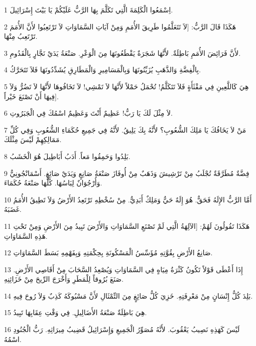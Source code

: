 \par 1 اِسْمَعُوا الْكَلِمَةَ الَّتِي تَكَلَّمَ بِهَا الرَّبُّ عَلَيْكُمْ يَا بَيْتَ إِسْرَائِيلَ.
\par 2 هَكَذَا قَالَ الرَّبُّ: [لاَ تَتَعَلَّمُوا طَرِيقَ الأُمَمِ وَمِنْ آيَاتِ السَّمَاوَاتِ لاَ تَرْتَعِبُوا لأَنَّ الأُمَمَ تَرْتَعِبُ مِنْهَا.
\par 3 لأَنَّ فَرَائِضَ الأُمَمِ بَاطِلَةٌ. لأَنَّهَا شَجَرَةٌ يَقْطَعُونَهَا مِنَ الْوَعْرِ. صَنْعَةُ يَدَيْ نَجَّارٍ بِالْقَدُومِ.
\par 4 بِالْفِضَّةِ وَالذَّهَبِ يُزَيِّنُونَهَا وَبِالْمَسَامِيرِ وَالْمَطَارِقِ يُشَدِّدُونَهَا فَلاَ تَتَحَرَّكُ.
\par 5 هِيَ كَاللَّعِينِ فِي مَقْثَأَةٍ فَلاَ تَتَكَلَّمُ! تُحْمَلُ حَمْلاً لأَنَّهَا لاَ تَمْشِي! لاَ تَخَافُوهَا لأَنَّهَا لاَ تَضُرُّ وَلاَ فِيهَا أَنْ تَصْنَعَ خَيْراً].
\par 6 لاَ مِثْلَ لَكَ يَا رَبُّ! عَظِيمٌ أَنْتَ وَعَظِيمٌ اسْمُكَ فِي الْجَبَرُوتِ.
\par 7 مَنْ لاَ يَخَافُكَ يَا مَلِكَ الشُّعُوبِ؟ لأَنَّهُ بِكَ يَلِيقُ. لأَنَّهُ فِي جَمِيعِ حُكَمَاءِ الشُّعُوبِ وَفِي كُلِّ مَمَالِكِهِمْ لَيْسَ مِثْلَكَ.
\par 8 بَلِدُوا وَحَمِقُوا مَعاً. أَدَبُ أَبَاطِيلَ هُوَ الْخَشَبُ.
\par 9 فِضَّةٌ مُطَرَّقَةٌ تُجْلَبُ مِنْ تَرْشِيشَ وَذَهَبٌ مِنْ أُوفَازَ صَنْعَةُ صَانِعٍ وَيَدَيْ صَائِغٍ. أَسْمَانْجُونِيٌّ وَأُرْجُوَانٌ لِبَاسُهَا. كُلُّهَا صَنْعَةُ حُكَمَاءَ.
\par 10 أَمَّا الرَّبُّ الإِلَهُ فَحَقٌّ. هُوَ إِلَهٌ حَيٌّ وَمَلِكٌ أَبَدِيٌّ. مِنْ سُخْطِهِ تَرْتَعِدُ الأَرْضُ وَلاَ تَطِيقُ الأُمَمُ غَضَبَهُ.
\par 11 هَكَذَا تَقُولُونَ لَهُمْ: [الآلِهَةُ الَّتِي لَمْ تَصْنَعِ السَّمَاوَاتِ وَالأَرْضَ تَبِيدُ مِنَ الأَرْضِ وَمِنْ تَحْتِ هَذِهِ السَّمَاوَاتِ.
\par 12 صَانِعُ الأَرْضِ بِقُوَّتِهِ مُؤَسِّسُ الْمَسْكُونَةِ بِحِكْمَتِهِ وَبِفَهْمِهِ بَسَطَ السَّمَاوَاتِ.
\par 13 إِذَا أَعْطَى قَوْلاً تَكُونُ كَثْرَةُ مِيَاهٍ فِي السَّمَاوَاتِ وَيُصْعِدُ السَّحَابَ مِنْ أَقَاصِي الأَرْضِ. صَنَعَ بُرُوقاً لِلْمَطَرِ وَأَخْرَجَ الرِّيحَ مِنْ خَزَائِنِهِ.
\par 14 بَلِدَ كُلُّ إِنْسَانٍ مِنْ مَعْرِفَتِهِ. خَزِيَ كُلُّ صَائِغٍ مِنَ التِّمْثَالِ لأَنَّ مَسْبُوكَهُ كَذِبٌ وَلاَ رُوحَ فِيهِ.
\par 15 هِيَ بَاطِلَةٌ صَنْعَةُ الأَضَالِيلِ. فِي وَقْتِ عِقَابِهَا تَبِيدُ.
\par 16 لَيْسَ كَهَذِهِ نَصِيبُ يَعْقُوبَ. لأَنَّهُ مُصَوِّرُ الْجَمِيعِ وَإِسْرَائِيلُ قَضِيبُ مِيرَاثِهِ. رَبُّ الْجُنُودِ اسْمُهُ.
